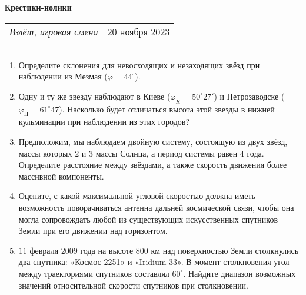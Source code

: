 \documentclass[11pt]{article}
\begin{document}
\begin{center}
	\textbf{\LARGE{Крестики-нолики}}
\end{center}
\begin{tabularx}{\textwidth}{Xr}
	{\textit{Взлёт, игровая смена}} & $20$ ноября $2023$ \\
\end{tabularx}

\noindent\rule{\textwidth}{0.4pt}

\begin{enumerate}[label=\textbf{A\arabic*.}]
	\item Определите склонения для невосходящих и незаходящих звёзд при наблюдении из Мезмая ($\varphi = 44^{\circ}$).
    \item Одну и ту же звезду наблюдают в Киеве ($\varphi_K = 50^{\circ}27'$) и Петрозаводске ($\varphi_{\text{П}} = 61^{\circ}47$). Насколько будет отличаться высота этой звезды в нижней кульминации при наблюдении из этих городов?
    \item Предположим, мы наблюдаем двойную систему, состоящую из двух звёзд, массы которых $2$ и $3$ массы Солнца, а период системы равен $4$ года. Определите расстояние между звёздами, а также скорость движения более массивной компоненты.
    \item Оцените, с какой максимальной угловой скоростью должна иметь возможность поворачиваться антенна дальней космической связи, чтобы она могла сопровождать любой из существующих искусственных спутников Земли при его движении над горизонтом.
    \item $11$ февраля $2009$ года на высоте $800$ км над поверхностью Земли столкнулись два спутника: «Космос-2251» и «Iridium 33». В момент столкновения угол между траекториями спутников составлял $60^\circ $. Найдите диапазон возможных значений относительной скорости спутников при столкновении. 
\end{enumerate}
\end{document}
